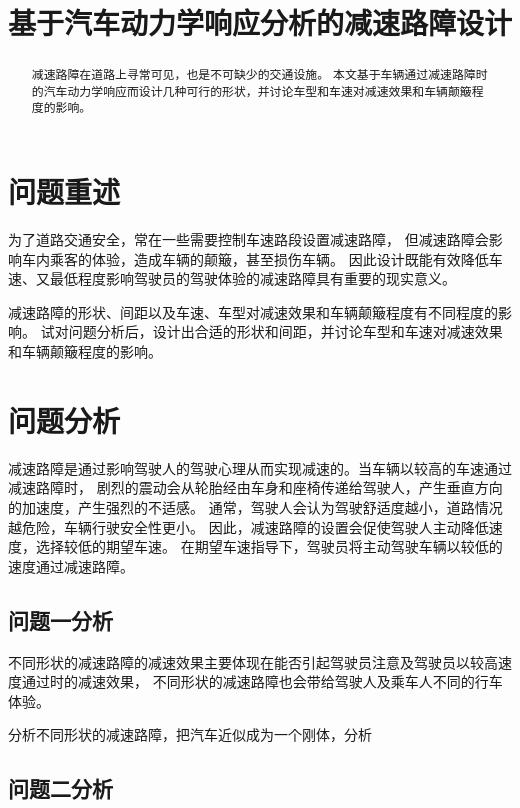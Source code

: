 \documentclass[withoutpreface,bwprint]{cumcmthesis}
\title{基于汽车动力学响应分析的减速路障设计}
\begin{document}
\maketitle
\begin{abstract}

减速路障在道路上寻常可见，也是不可缺少的交通设施。
本文基于车辆通过减速路障时的汽车动力学响应而设计几种可行的形状，并讨论车型和车速对减速效果和车辆颠簸程度的影响。

\end{abstract}

\section{问题重述}

为了道路交通安全，常在一些需要控制车速路段设置减速路障，
但减速路障会影响车内乘客的体验，造成车辆的颠簸，甚至损伤车辆。
因此设计既能有效降低车速、又最低程度影响驾驶员的驾驶体验的减速路障具有重要的现实意义。

减速路障的形状、间距以及车速、车型对减速效果和车辆颠簸程度有不同程度的影响。
试对问题分析后，设计出合适的形状和间距，并讨论车型和车速对减速效果和车辆颠簸程度的影响。

\section{问题分析}

减速路障是通过影响驾驶人的驾驶心理从而实现减速的。当车辆以较高的车速通过减速路障时，
剧烈的震动会从轮胎经由车身和座椅传递给驾驶人，产生垂直方向的加速度，产生强烈的不适感。
通常，驾驶人会认为驾驶舒适度越小，道路情况越危险，车辆行驶安全性更小。
因此，减速路障的设置会促使驾驶人主动降低速度，选择较低的期望车速。
在期望车速指导下，驾驶员将主动驾驶车辆以较低的速度通过减速路障。

\subsection{问题一分析}

不同形状的减速路障的减速效果主要体现在能否引起驾驶员注意及驾驶员以较高速度通过时的减速效果，
不同形状的减速路障也会带给驾驶人及乘车人不同的行车体验。

分析不同形状的减速路障，把汽车近似成为一个刚体，分析

\subsection{问题二分析}
\end{document}
